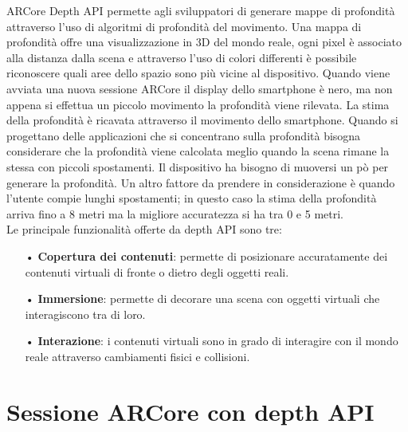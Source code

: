 \documentclass[crop=false, class=book]{standalone}
\begin{document}
		ARCore Depth API  permette agli sviluppatori di generare mappe di profondità attraverso l'uso di algoritmi di 					profondità del movimento. Una mappa di profondità offre una visualizzazione in 3D del mondo reale, ogni pixel è 				associato alla distanza dalla scena e attraverso l'uso di colori differenti è possibile riconoscere quali aree dello 			spazio sono più vicine al dispositivo. Quando viene avviata una nuova sessione ARCore il display dello smartphone è 			nero, ma non appena si effettua un piccolo movimento la profondità viene rilevata. La stima della profondità è ricavata 		attraverso il movimento dello smartphone. Quando si progettano delle applicazioni che si concentrano sulla profondità 			bisogna considerare che la profondità viene calcolata meglio quando la scena rimane la stessa con piccoli spostamenti. 			Il dispositivo ha bisogno di muoversi un pò per generare la profondità. Un altro fattore da prendere in considerazione 			è quando l'utente compie lunghi spostamenti; in questo caso la stima della profondità arriva fino a 8 metri ma la 				migliore accuratezza si ha tra 0 e 5 metri.\\
		 Le principale funzionalità offerte da depth API sono tre:
		
		\begin{itemize}
			\item[•] \textbf{Copertura dei contenuti}: permette di posizionare accuratamente dei contenuti virtuali di fronte o dietro degli oggetti reali.
			\item[•] \textbf{Immersione}: permette di decorare una scena con oggetti virtuali che interagiscono tra di loro.
			\item[•] \textbf{Interazione}: i contenuti virtuali sono in grado di interagire con il mondo reale attraverso cambiamenti fisici e collisioni.
		\end{itemize}
		
		\section{Sessione ARCore con depth API}
		
\end{document}
